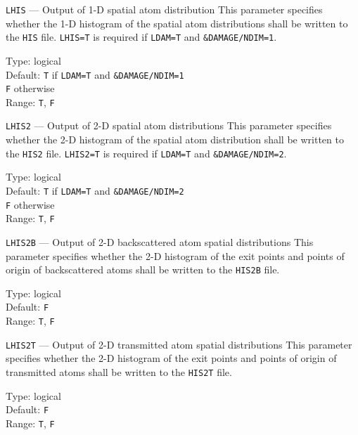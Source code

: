 \begin{keydescription}{\texttt{LHIS} --- Output of 1-D spatial atom distribution}
%
  This parameter specifies whether the 1-D histogram of the spatial atom distributions shall be 
  written to the \texttt{HIS} file. \texttt{LHIS=T} is required if
  \texttt{LDAM=T} and \texttt{\&DAMAGE/NDIM=1}.
  \begin{keytab}
    Type:    \> logical \\
    Default: \> \texttt{T} if \texttt{LDAM=T} and \texttt{\&DAMAGE/NDIM=1} \\
             \> \texttt{F} otherwise \\
    Range:   \> \texttt{T}, \texttt{F} 
  \end{keytab}
\end{keydescription}

\begin{keydescription}{\texttt{LHIS2} --- Output of 2-D spatial atom distributions}
%
  This parameter specifies whether the 2-D histogram of the spatial atom distribution shall be 
  written to the \texttt{HIS2} file. \texttt{LHIS2=T} is required if
  \texttt{LDAM=T} and \texttt{\&DAMAGE/NDIM=2}.
  \begin{keytab}
    Type:    \> logical \\
    Default: \> \texttt{T} if \texttt{LDAM=T} and \texttt{\&DAMAGE/NDIM=2} \\
             \> \texttt{F} otherwise \\
    Range:   \> \texttt{T}, \texttt{F} 
  \end{keytab}
\end{keydescription}

\begin{keydescription}{\texttt{LHIS2B} --- Output of 2-D backscattered atom spatial distributions}
%
  This parameter specifies whether the 2-D histogram of the exit points
  and points of origin of backscattered atoms shall be written to
  the \texttt{HIS2B} file.
  \begin{keytab}
    Type:    \> logical \\
    Default: \> \texttt{F} \\
    Range:   \> \texttt{T}, \texttt{F} 
  \end{keytab}
\end{keydescription}

\begin{keydescription}{\texttt{LHIS2T} --- Output of 2-D transmitted atom spatial distributions}
%
  This parameter specifies whether the 2-D histogram of the exit points
  and points of origin of transmitted atoms shall be written to
  the \texttt{HIS2T} file.
  \begin{keytab}
    Type:    \> logical \\
    Default: \> \texttt{F} \\
    Range:   \> \texttt{T}, \texttt{F} 
  \end{keytab}
\end{keydescription}

